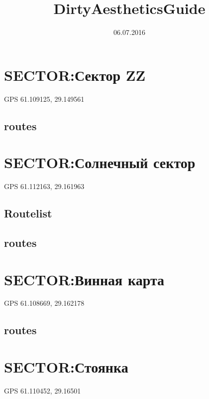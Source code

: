 \documentclass[8pt, a5paper,notitlepage,openany]{report}
\begin{document}
\title{DirtyAestheticsGuide}
\date{06.07.2016}
\tableofcontents
\pagestyle{fancy}




\chapter{SECTOR:Сектор ZZ}
GPS 61.109125, 29.149561
%
\newpage
\section*{routes}


 \clearpage 
\chapter{SECTOR:Солнечный сектор}
 GPS 61.112163, 29.161963
\section*{Routelist}
%
\newpage
\section*{routes}



\clearpage 
\chapter{SECTOR:Винная карта}
 GPS 61.108669, 29.162178
% 
 \newpage
 \section*{routes}
 
 

 \clearpage 
\chapter{SECTOR:Стоянка}
 GPS 61.110452, 29.16501
%
\newpage
\end{document}
